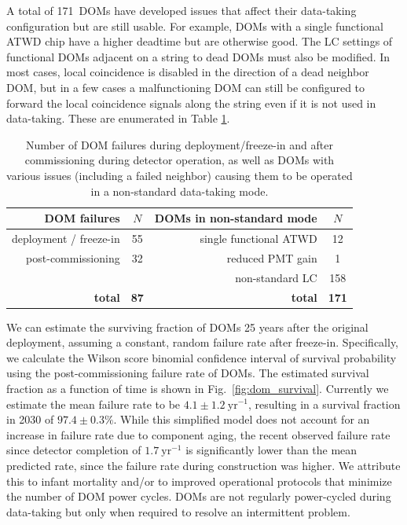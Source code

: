 A total of 171~DOMs have developed issues that affect their data-taking
configuration but are still usable.  For example, DOMs with a single functional
ATWD chip have a higher deadtime but are otherwise good.  The LC settings of functional DOMs adjacent on a string to
dead DOMs must also be modified. In most cases, local coincidence is
disabled in the direction of a dead neighbor DOM, but in a few cases a
malfunctioning DOM can still be configured to forward the local
coincidence signals along the string even if it is not used in
data-taking. These are enumerated in Table \ref{tab:dom_failures}.  

\begin{table}[h]
  \centering
  \caption{Number of DOM failures during deployment/freeze-in and after
    commissioning during detector operation, as well as DOMs with various
    issues (including a failed neighbor) causing them to be operated in a
    non-standard data-taking mode.} 
  \label{tab:dom_failures}
  \begin{tabular}{rc|rc}
    \toprule
    DOM failures & $N$ & DOMs in non-standard mode & $N$\\
    \hline    
    deployment / freeze-in & 55 &single functional ATWD & 12\\
    post-commissioning & 32  & reduced PMT gain & 1 \\
   & & non-standard LC & 158 \\
 \bf{total} & \bf{87} & \bf{total}& \bf{171}\\
    \bottomrule 
  \end{tabular}
\end{table}

We can estimate the surviving fraction of DOMs 25 years after the original
deployment, assuming a constant, random failure rate after freeze-in.
Specifically, we calculate the Wilson score binomial confidence interval \cite{Wilson_Score} of
survival probability using the post-commissioning failure rate of DOMs.
The estimated survival fraction as a function of 
time is shown in Fig.~\ref{fig:dom_survival}.  Currently we estimate the
mean failure rate to be $4.1\pm1.2~\mathrm{yr}^{-1}$, resulting in a
survival fraction in 2030 of $97.4\pm0.3\%$.  While this simplified 
model does not account for an increase in failure rate due to component aging, the
recent observed failure rate since detector completion of $1.7~\mathrm{yr}^{-1}$ is
significantly lower than the mean predicted rate, since the failure rate
during construction was higher.  We attribute
this to infant mortality and/or to improved operational protocols that
minimize the number of DOM power cycles.  DOMs are not regularly
power-cycled during data-taking but only when required to resolve an
intermittent problem.


